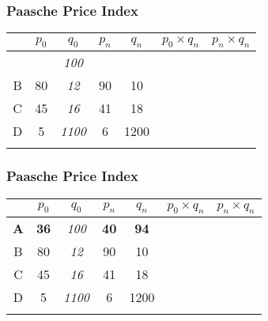 \documentclass{beamer}
\begin{document}
\begin{frame}
\frametitle{Paasche Price Index}
\begin{center}
\LARGE
\begin{tabular}{|c||c|c||c|c||c|c|}
\hline  &\phantom{s}$p_0$\phantom{s}	&	$q_0$	&	$p_n$	&	$q_n$	&	$p_0 \times q_n$	&	$p_n \times q_n$	\\	\hline \hline
\textbf{{\color{red}{A}}} & \textbf{{\color{red}{36}}}	&	\textit{100}	&	\textbf{{\color{red}{40}}}	&	\textbf{{\color{red}{94}}}	&	\phantom{3600}	&	\phantom{4000}	\\	\hline
B & 80	&	\textit{12}	&	90	&	10	&	\phantom{960}	&	\phantom{1080}	\\	\hline
C & 45	&	\textit{16}	&	41	&	18	&	\phantom{720}	&	\phantom{656}	\\	\hline
D & 5	&	\textit{1100}	&	6	&	1200	&	\phantom{5500}	&	\phantom{6600}	\\	\hline \hline
& 	&		&		&		&	\phantom{10780}	&	\phantom{12336}	\\	\hline
\end{tabular} 
\end{center}
\end{frame}
\begin{frame}
\frametitle{Paasche Price Index}
\begin{center}
\LARGE
\begin{tabular}{|c||c|c||c|c||c|c|}
\hline  &\phantom{s}$p_0$\phantom{s}	&	$q_0$	&	$p_n$	&	$q_n$	&	$p_0 \times q_n$	&	$p_n \times q_n$	\\	\hline \hline
\textbf{A} & \textbf{36}	&	\textit{100}	&	\textbf{40}	&	\textbf{94}	&	\textbf{{\color{red}{3600}}}	&	\textbf{{\color{red}{4000}}}	\\	\hline
B & 80	&	\textit{12}	&	90	&	10	&	\phantom{960}	&	\phantom{1080}	\\	\hline
C & 45	&	\textit{16}	&	41	&	18	&	\phantom{720}	&	\phantom{656}	\\	\hline
D & 5	&	\textit{1100}	&	6	&	1200	&	\phantom{5500}	&	\phantom{6600}	\\	\hline \hline
& 	&		&		&		&	\phantom{10780}	&	\phantom{12336}	\\	\hline
\end{tabular} 
\end{center}
\end{frame}
\end{document}
